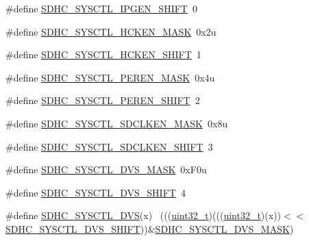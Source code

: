 \begin{DoxyCompactItemize}
\item 
\#define \hyperlink{group___s_d_h_c___register___masks_ga9ef6104b46076dd92183a99579d95771}{S\+D\+H\+C\+\_\+\+S\+Y\+S\+C\+T\+L\+\_\+\+I\+P\+G\+E\+N\+\_\+\+S\+H\+I\+FT}~0
\item 
\#define \hyperlink{group___s_d_h_c___register___masks_gaefb48b61c548dd73ba8ae645d6e0c889}{S\+D\+H\+C\+\_\+\+S\+Y\+S\+C\+T\+L\+\_\+\+H\+C\+K\+E\+N\+\_\+\+M\+A\+SK}~0x2u
\item 
\#define \hyperlink{group___s_d_h_c___register___masks_gab4bc40b459bbe0c405262109e6765e69}{S\+D\+H\+C\+\_\+\+S\+Y\+S\+C\+T\+L\+\_\+\+H\+C\+K\+E\+N\+\_\+\+S\+H\+I\+FT}~1
\item 
\#define \hyperlink{group___s_d_h_c___register___masks_ga23b3d2c76db562da51b824fa435f306c}{S\+D\+H\+C\+\_\+\+S\+Y\+S\+C\+T\+L\+\_\+\+P\+E\+R\+E\+N\+\_\+\+M\+A\+SK}~0x4u
\item 
\#define \hyperlink{group___s_d_h_c___register___masks_ga28db53e7da45cb7a0ed9de6c7bac7a85}{S\+D\+H\+C\+\_\+\+S\+Y\+S\+C\+T\+L\+\_\+\+P\+E\+R\+E\+N\+\_\+\+S\+H\+I\+FT}~2
\item 
\#define \hyperlink{group___s_d_h_c___register___masks_ga19de408b244a32169fec30115c0b8a4a}{S\+D\+H\+C\+\_\+\+S\+Y\+S\+C\+T\+L\+\_\+\+S\+D\+C\+L\+K\+E\+N\+\_\+\+M\+A\+SK}~0x8u
\item 
\#define \hyperlink{group___s_d_h_c___register___masks_ga4dbc0c5f5a10fdd6b7fb6642f10548df}{S\+D\+H\+C\+\_\+\+S\+Y\+S\+C\+T\+L\+\_\+\+S\+D\+C\+L\+K\+E\+N\+\_\+\+S\+H\+I\+FT}~3
\item 
\#define \hyperlink{group___s_d_h_c___register___masks_ga8311f017ab13388163976f2e422d072d}{S\+D\+H\+C\+\_\+\+S\+Y\+S\+C\+T\+L\+\_\+\+D\+V\+S\+\_\+\+M\+A\+SK}~0x\+F0u
\item 
\#define \hyperlink{group___s_d_h_c___register___masks_gafc17e8d8673044839bfc65d01ea0bc0b}{S\+D\+H\+C\+\_\+\+S\+Y\+S\+C\+T\+L\+\_\+\+D\+V\+S\+\_\+\+S\+H\+I\+FT}~4
\item 
\#define \hyperlink{group___s_d_h_c___register___masks_gaeeca8dd5539770bb8889af81539b60c8}{S\+D\+H\+C\+\_\+\+S\+Y\+S\+C\+T\+L\+\_\+\+D\+VS}(x)                                          ~(((\hyperlink{_p_e___types_8h_a33594304e786b158f3fb30289278f5af}{uint32\+\_\+t})(((\hyperlink{_p_e___types_8h_a33594304e786b158f3fb30289278f5af}{uint32\+\_\+t})(x))$<$$<$\hyperlink{group___s_d_h_c___register___masks_gafc17e8d8673044839bfc65d01ea0bc0b}{S\+D\+H\+C\+\_\+\+S\+Y\+S\+C\+T\+L\+\_\+\+D\+V\+S\+\_\+\+S\+H\+I\+FT}))\&\hyperlink{group___s_d_h_c___register___masks_ga8311f017ab13388163976f2e422d072d}{S\+D\+H\+C\+\_\+\+S\+Y\+S\+C\+T\+L\+\_\+\+D\+V\+S\+\_\+\+M\+A\+SK})
$$
\end{DoxyCompactItemize}
